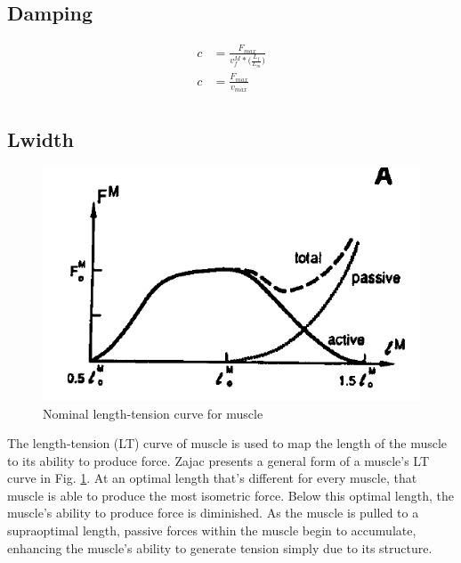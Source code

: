 \documentclass[runningheads,a4paper]{llncs}
\begin{document}
	\subsection{Damping}
	\begin{align*}
		c &= \frac{F_{max}}{v_{f}^{M}*\big(\frac{L_{f}}{L_{m}}\big)} \\
		c &= \frac{F_{max}}{v_{max}} \\
	\end{align*}
	\subsection{Lwidth}
			\begin{figure}
				\centering
				\includegraphics[width=.7\textwidth]{lwidth3.PNG}
				\caption{Nominal length-tension curve for muscle}
				\label{fig:lwidth3}
			\end{figure}
		The length-tension (LT) curve of muscle is used to map the length of the muscle to its ability to produce force. Zajac presents a general form of a muscle's LT curve in Fig. \ref{fig:lwidth3}. At an optimal length that's different for every muscle, that muscle is able to produce the most isometric force. Below this optimal length, the muscle's ability to produce force is diminished. As the muscle is pulled to a supraoptimal length, passive forces within the muscle begin to accumulate, enhancing the muscle's ability to generate tension simply due to its structure. \par
\end{document}
